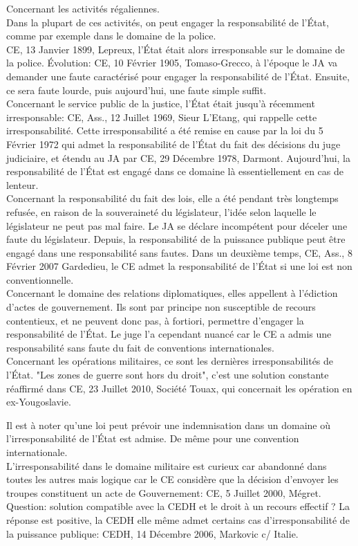 \documentclass[10pt, a4paper, openany]{book}
\begin{document}
Concernant les activités régaliennes. \\
Dans la plupart de ces activités, on peut engager la responsabilité de l'État, comme par exemple dans le domaine de la police. \\
CE, 13 Janvier 1899, Lepreux, l'État était alors irresponsable sur le domaine de la police. Évolution: CE, 10 Février 1905, Tomaso-Grecco, à l'époque le JA va demander une faute caractérisé pour engager la responsabilité de l'État. Ensuite, ce sera faute lourde, puis aujourd'hui, une faute simple suffit. \\
Concernant le service public de la justice, l'État était jusqu'à récemment irresponsable: CE, Ass., 12 Juillet 1969, Sieur L'Etang, qui rappelle cette irresponsabilité. Cette irresponsabilité a été remise en cause par la loi du 5 Février 1972 qui admet la responsabilité de l'État du fait des décisions du juge judiciaire, et étendu au JA par CE, 29 Décembre 1978, Darmont. Aujourd'hui, la responsabilité de l'État est engagé dans ce domaine là essentiellement en cas de lenteur. \\
Concernant la responsabilité du fait des lois, elle a été pendant très longtemps refusée, en raison de la souveraineté du législateur, l'idée selon laquelle le législateur ne peut pas mal faire. Le JA se déclare incompétent pour déceler une faute du législateur. Depuis, la responsabilité de la puissance publique peut être engagé dans une responsabilité sans fautes. Dans un deuxième temps, CE, Ass., 8 Février 2007 Gardedieu, le CE admet la responsabilité de l'État si une loi est non conventionnelle. \\
Concernant le domaine des relations diplomatiques, elles appellent à l'édiction d'actes de gouvernement. Ils sont par principe non susceptible de recours contentieux, et ne peuvent donc pas, à fortiori, permettre d'engager la responsabilité de l'État. Le juge l'a cependant nuancé car le CE a admis une responsabilité sans faute du fait de conventions internationales. \\
Concernant les opérations militaires, ce sont les dernières irresponsabilités de l'État. "Les zones de guerre sont hors du droit", c'est une solution constante réaffirmé dans CE, 23 Juillet 2010, Société Touax, qui concernait les opération en ex-Yougoslavie. 


Il est à noter qu'une loi peut prévoir une indemnisation dans un domaine où l'irresponsabilité de l'État est admise. De même pour une convention internationale. \\
L'irresponsabilité dans le domaine militaire est curieux car abandonné dans toutes les autres mais logique car le CE considère que la décision d'envoyer les troupes constituent un acte de Gouvernement: CE, 5 Juillet 2000, Mégret. Question: solution compatible avec la CEDH et le droit à un recours effectif ? La réponse est positive, la CEDH elle même admet certains cas d'irresponsabilité de la puissance publique: CEDH, 14 Décembre 2006, Markovic c/ Italie. 
\end{document}
